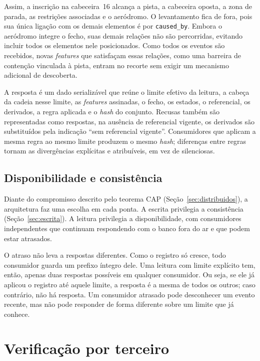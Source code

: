 Assim, a inscrição na cabeceira~16 alcança a pista, a cabeceira oposta, a
zona de parada, as restrições associadas e o aeródromo. O levantamento fica
de fora, pois sua única ligação com os demais elementos é por
\texttt{caused\_by}. Embora o aeródromo integre o fecho, suas demais relações
não são percorridas, evitando incluir todos os elementos nele posicionados.
Como todos os eventos são recebidos, novas \textit{features} que satisfaçam
essas relações, como uma barreira de contenção vinculada à pista, entram no
recorte sem exigir um mecanismo adicional de descoberta.

A resposta é um dado serializável que reúne o limite efetivo da leitura, a
cabeça da cadeia nesse limite, as \textit{features} assinadas, o fecho, os
estados, o referencial, os derivados, a regra aplicada e o \textit{hash} do
conjunto. Recusas também são representadas como respostas, na ausência de
referencial vigente, os derivados são substituídos pela indicação ``sem
referencial vigente''. Consumidores que aplicam a mesma regra ao mesmo
limite produzem o mesmo \textit{hash}; diferenças entre regras tornam as
divergências explícitas e atribuíveis, em vez de silenciosas.

\subsection{Disponibilidade e consistência}

Diante do compromisso descrito pelo teorema CAP (Seção~\ref{sec:distribuidos}), a arquitetura faz uma escolha em cada ponta. A escrita privilegia a consistência (Seção~\ref{sec:escrita}). A leitura privilegia a disponibilidade, com consumidores independentes que continuam respondendo com o banco fora do ar e que podem estar atrasados.

O atraso não leva a respostas diferentes. Como o registro só cresce, todo consumidor guarda um prefixo íntegro dele. Uma leitura com limite explícito tem, então, apenas duas respostas possíveis em qualquer consumidor. Ou seja, se ele já aplicou o registro até aquele limite, a resposta é a mesma de todos os outros; caso contrário, não há resposta. Um consumidor atrasado pode desconhecer um evento recente, mas não pode responder de forma diferente sobre um limite que já conhece.

\section{Verificação por terceiro}\label{sec:verificacao}

